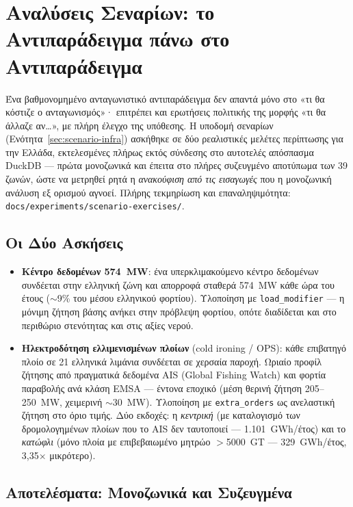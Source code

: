 \section{Αναλύσεις Σεναρίων: το Αντιπαράδειγμα πάνω στο Αντιπαράδειγμα}
\label{sec:scenario-studies}

Ένα βαθμονομημένο ανταγωνιστικό αντιπαράδειγμα δεν απαντά μόνο στο «τι θα κόστιζε ο ανταγωνισμός»· επιτρέπει και ερωτήσεις πολιτικής της μορφής «τι θα άλλαζε αν\ldots», με πλήρη έλεγχο της υπόθεσης. Η υποδομή σεναρίων (Ενότητα~\ref{sec:scenario-infra}) ασκήθηκε σε δύο ρεαλιστικές μελέτες περίπτωσης για την Ελλάδα, εκτελεσμένες πλήρως εκτός σύνδεσης στο αυτοτελές απόσπασμα DuckDB --- πρώτα μονοζωνικά και έπειτα στο πλήρες συζευγμένο αποτύπωμα των 39 ζωνών, ώστε να μετρηθεί ρητά η \emph{ανακούφιση από τις εισαγωγές} που η μονοζωνική ανάλυση εξ ορισμού αγνοεί. Πλήρης τεκμηρίωση και επαναληψιμότητα: \texttt{docs/experiments/scenario-exercises/}.

\subsection{Οι Δύο Ασκήσεις}
\label{subsec:scenario-setup}

\begin{itemize}
\item \textbf{Κέντρο δεδομένων 574~MW}: ένα υπερκλιμακούμενο κέντρο δεδομένων συνδέεται στην ελληνική ζώνη και απορροφά σταθερά 574~MW κάθε ώρα του έτους ($\sim$9\% του μέσου ελληνικού φορτίου). Υλοποίηση με \texttt{load\_modifier} --- η μόνιμη ζήτηση βάσης ανήκει στην πρόβλεψη φορτίου, οπότε διαδίδεται και στο περιθώριο στενότητας και στις αξίες νερού.
\item \textbf{Ηλεκτροδότηση ελλιμενισμένων πλοίων} (cold ironing / OPS): κάθε επιβατηγό πλοίο σε 21 ελληνικά λιμάνια συνδέεται σε χερσαία παροχή. Ωριαίο προφίλ ζήτησης από πραγματικά δεδομένα AIS (Global Fishing Watch) και φορτία παραβολής ανά κλάση EMSA --- έντονα εποχικό (μέση θερινή ζήτηση 205--250~MW, χειμερινή $\sim$30~MW). Υλοποίηση με \texttt{extra\_orders} ως ανελαστική ζήτηση στο όριο τιμής. Δύο εκδοχές: η \emph{κεντρική} (με καταλογισμό των δρομολογημένων πλοίων που το AIS δεν ταυτοποιεί --- 1.101~GWh/έτος) και το \emph{κατώφλι} (μόνο πλοία με επιβεβαιωμένο μητρώο $>$5000~GT --- 329~GWh/έτος, 3,35$\times$ μικρότερο).
\end{itemize}

\subsection{Αποτελέσματα: Μονοζωνικά και Συζευγμένα}
\label{subsec:scenario-results}

